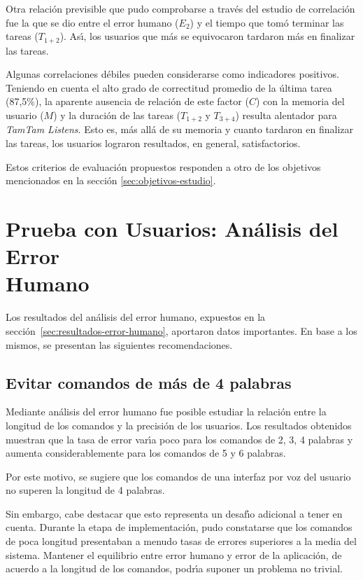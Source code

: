 Otra relaci\'on previsible que pudo comprobarse a trav\'es del estudio de correlaci\'on fue la que
se dio entre el error humano ($E_2$) y el tiempo que tom\'o terminar las tareas ($T_{1+2}$). 
As{{\'\i}}, los usuarios que m\'as se equivocaron tardaron m\'as en finalizar las tareas.

Algunas correlaciones d\'ebiles pueden considerarse como indicadores positivos. Teniendo en cuenta
el alto grado de correctitud promedio de la \'ultima tarea (87,5\%), la aparente ausencia de relaci\'on 
de este factor ($C$) con la memoria del usuario ($M$) y la duraci\'on de las tareas 
($T_{1+2}$ y $T_{3+4}$) resulta alentador para \emph{TamTam Listens}. Esto es, m\'as all\'a de su 
memoria y cuanto tardaron en finalizar las tareas, los usuarios lograron resultados,
en general, satisfactorios.

Estos criterios de evaluaci\'on propuestos responden a otro de los objetivos mencionados
en la secci\'on \ref{sec:objetivos-estudio}.

\section[Prueba con Usuarios: An\'alisis del Error Humano]
{Prueba con Usuarios: An\'alisis del Error \\ Humano}
Los resultados del an\'alisis del error humano, expuestos en la secci\'on~\ref{sec:resultados-error-humano},
aportaron datos importantes. En base a los mismos, se presentan las siguientes recomendaciones.

\subsection{Evitar comandos de m\'as de 4 palabras}
Mediante an\'alisis del error humano fue posible estudiar la relaci\'on entre la longitud de los comandos
y la precisi\'on de los usuarios. Los resultados obtenidos muestran que la tasa de error
var{{\'\i}}a poco para los comandos de 2, 3, 4 palabras y aumenta considerablemente para los comandos
de 5 y 6 palabras.

Por este motivo, se sugiere que los comandos de una interfaz por voz del usuario 
no superen la longitud de 4 palabras.

Sin embargo, cabe destacar que esto representa un desaf{{\'\i}}o adicional a tener en cuenta.
Durante la etapa de implementaci\'on, pudo constatarse que los comandos de poca longitud presentaban
a menudo tasas de errores superiores a la media del sistema.
Mantener el equilibrio entre error humano y error de la aplicaci\'on, de acuerdo a la longitud
de los comandos, podr{{\'\i}}a suponer un problema no trivial. 

